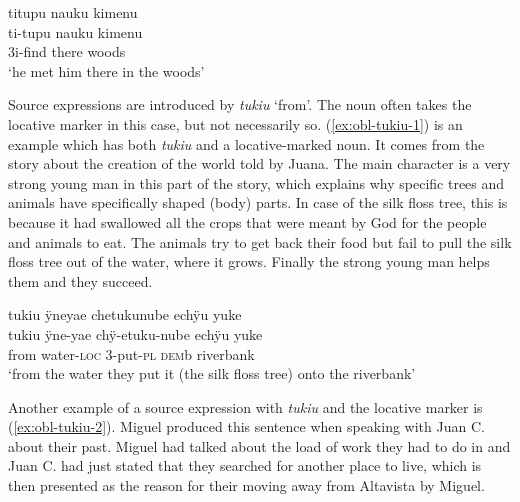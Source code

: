 \ea\label{ex:obl-unm-2}
\begingl
\glpreamble titupu nauku kimenu\\
\gla ti-tupu nauku kimenu\\
\glb 3i-find there woods\\
\glft ‘he met him there in the woods’
\endgl
\trailingcitation{[jmx-n120429ls-x5.412]}
\xe

%


Source expressions are introduced by \textit{tukiu} ‘from’. The noun often takes the locative marker in this case, but not necessarily so.
(\ref{ex:obl-tukiu-1}) is an example which has both \textit{tukiu} and a locative-marked noun. It comes from the story about the creation of the world told by Juana. The main character is a very strong young man in this part of the story, which explains why specific trees and animals have specifically shaped (body) parts. In case of the silk floss tree, this is because it had swallowed all the crops that were meant by God for the people and animals to eat. The animals try to get back their food but fail to pull the silk floss tree out of the water, where it grows. Finally the strong young man helps them and they succeed.

\ea\label{ex:obl-tukiu-1}
\begingl
\glpreamble tukiu ÿneyae chetukunube echÿu yuke\\
\gla tukiu ÿne-yae chÿ-etuku-nube echÿu yuke\\
\glb from water-\textsc{loc} 3-put-\textsc{pl} \textsc{dem}b riverbank\\
\glft ‘from the water they put it (the silk floss tree) onto the riverbank’
\endgl
\trailingcitation{[jxx-n101013s-1.784]}
\xe

Another example of a source expression with \textit{tukiu} and the locative marker is (\ref{ex:obl-tukiu-2}). Miguel produced this sentence when speaking with Juan C. about their past. Miguel had talked about the load of work they had to do in  and Juan C. had just stated that they searched for another place to live, which is then presented as the reason for their moving away from Altavista by Miguel. 

